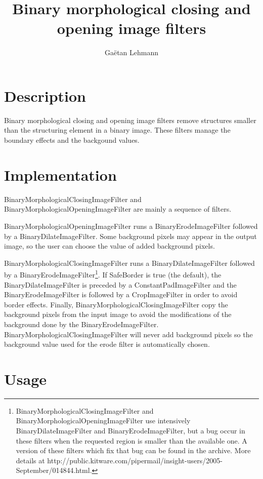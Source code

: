 \documentclass[IJ]{cesj}
\author{Ga\"etan Lehmann}
\institute{Biologie du d\'eveloppement et de la reproduction, INRA de Jouy-en-Josas}
\title{Binary morphological closing and opening image filters}
\begin{document}
\lstset{language=c++}
\maketitle

\section{Description}

Binary morphological closing and opening image filters remove structures smaller than the structuring element in a binary image. These filters manage the boundary effects and the backgound values.

\section{Implementation}

BinaryMorphologicalClosingImageFilter and BinaryMorphologicalOpeningImageFilter are mainly a sequence of filters.

BinaryMorphologicalOpeningImageFilter runs a BinaryErodeImageFilter followed by a BinaryDilateImageFilter. Some background pixels may appear in the output image, so the user can choose the value of added background pixels.

BinaryMorphologicalClosingImageFilter runs a BinaryDilateImageFilter followed by a BinaryErodeImageFilter\footnote{BinaryMorphologicalClosingImageFilter and BinaryMorphologicalOpeningImageFilter use intensively BinaryDilateImageFilter and BinaryErodeImageFilter, but a bug occur in these filters when the requested region is smaller than the available one. A version of these filters which fix that bug can be found in the archive. More details at http://public.kitware.com/pipermail/insight-users/2005-September/014844.html.}. If SafeBorder is true (the default), the BinaryDilateImageFilter is preceded by a ConstantPadImageFilter and the BinaryErodeImageFilter is followed by a CropImageFilter in order to avoid border effects. Finally, BinaryMorphologicalClosingImageFilter copy the background pixels from the input image to avoid the modifications of the background done by the BinaryErodeImageFilter. BinaryMorphologicalClosingImageFilter will never add background pixels so the background value used for the erode filter is automatically chosen.

\section{Usage}
\end{document}
